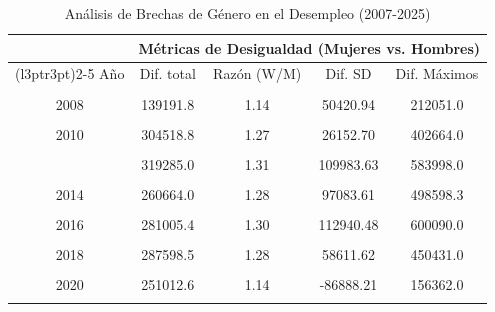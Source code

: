 \documentclass[
  11pt,
  letterpaper,
  DIV=11,
  numbers=noendperiod]{scrartcl}
\begin{document}
\begin{longtable}[t]{ccccc}
\caption{\label{tab:unnamed-chunk-2}Análisis de Brechas de Género en el Desempleo (2007-2025)}\\
\toprule
\multicolumn{1}{c}{ } & \multicolumn{4}{c}{Métricas de Desigualdad (Mujeres vs. Hombres)} \\
\cmidrule(l{3pt}r{3pt}){2-5}
Año & Dif. total & Razón (W/M) & Dif. SD & Dif. Máximos\\
\midrule
\cellcolor{gray!10}{2007} & \cellcolor{gray!10}{151440.9} & \cellcolor{gray!10}{1.15} & \cellcolor{gray!10}{71932.36} & \cellcolor{gray!10}{329864.0}\\
2008 & 139191.8 & 1.14 & 50420.94 & 212051.0\\
\cellcolor{gray!10}{2009} & \cellcolor{gray!10}{226437.8} & \cellcolor{gray!10}{1.20} & \cellcolor{gray!10}{14356.15} & \cellcolor{gray!10}{272171.0}\\
2010 & 304518.8 & 1.27 & 26152.70 & 402664.0\\
\cellcolor{gray!10}{2011} & \cellcolor{gray!10}{307793.1} & \cellcolor{gray!10}{1.30} & \cellcolor{gray!10}{117131.26} & \cellcolor{gray!10}{571597.0}\\
\addlinespace
2012 & 319285.0 & 1.31 & 109983.63 & 583998.0\\
\cellcolor{gray!10}{2013} & \cellcolor{gray!10}{281617.5} & \cellcolor{gray!10}{1.29} & \cellcolor{gray!10}{95782.45} & \cellcolor{gray!10}{476813.0}\\
2014 & 260664.0 & 1.28 & 97083.61 & 498598.3\\
\cellcolor{gray!10}{2015} & \cellcolor{gray!10}{296320.4} & \cellcolor{gray!10}{1.33} & \cellcolor{gray!10}{58441.97} & \cellcolor{gray!10}{442042.8}\\
2016 & 281005.4 & 1.30 & 112940.48 & 600090.0\\
\addlinespace
\cellcolor{gray!10}{2017} & \cellcolor{gray!10}{296393.1} & \cellcolor{gray!10}{1.31} & \cellcolor{gray!10}{71856.76} & \cellcolor{gray!10}{460357.0}\\
2018 & 287598.5 & 1.28 & 58611.62 & 450431.0\\
\cellcolor{gray!10}{2019} & \cellcolor{gray!10}{295008.8} & \cellcolor{gray!10}{1.26} & \cellcolor{gray!10}{64435.40} & \cellcolor{gray!10}{505925.0}\\
2020 & 251012.6 & 1.14 & -86888.21 & 156362.0\\
\cellcolor{gray!10}{2021} & \cellcolor{gray!10}{114641.7} & \cellcolor{gray!10}{1.07} & \cellcolor{gray!10}{48483.40} & \cellcolor{gray!10}{238601.0}\\

\end{longtable}
\end{document}
